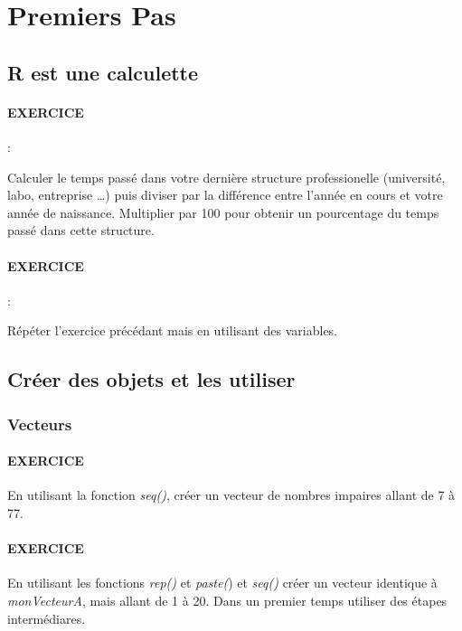 \section{Premiers Pas}
\subsection{R est une calculette}



\paragraph{EXERCICE} : 

 Calculer le temps passé dans votre dernière structure professionelle (université, labo, entreprise \dots)
 puis diviser par la différence entre l'année en cours et votre année de naissance. Multiplier par 100 pour obtenir un pourcentage du temps passé 
 dans cette structure.\par



\paragraph{EXERCICE} : 

Répéter l'exercice précédant mais en utilisant des variables.
\subsection{Créer des objets et les utiliser}

\subsubsection{Vecteurs}



\paragraph{EXERCICE} En utilisant la fonction \emph{seq()}, créer un vecteur de nombres impaires allant de 7 à 77. 



\paragraph{EXERCICE} En utilisant les fonctions \emph{rep()} et \emph{paste(}) et \emph{seq()} créer un vecteur identique à \emph{monVecteurA}, mais allant de 1 à 20. Dans un premier temps utiliser des étapes intermédiares.

